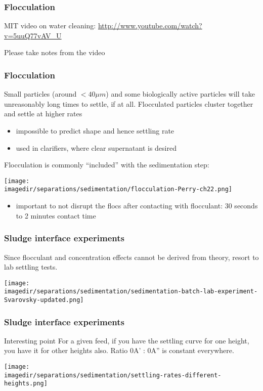 \begin{frame}\frametitle{Flocculation}
	MIT video on water cleaning: \href{http://www.youtube.com/watch?v=5uuQ77vAV\_U}{http://www.youtube.com/watch?v=5uuQ77vAV\_U}
	
	\vspace{7cm}
	{\tiny Please take notes from the video}
\end{frame}

\begin{frame}\frametitle{Flocculation}
	Small particles (around $< 40 \mu m$) and some biologically active particles will take unreasonably long times to settle, if at all.
	\vspace{12pt}	
	Flocculated particles cluster together and settle at higher rates
	\begin{itemize}
		\item	impossible to predict shape and hence settling rate
		\item	used in clarifiers, where clear supernatant is desired
	\end{itemize}
	\vspace{12pt}
	Flocculation is commonly ``included'' with the sedimentation step:
	\begin{center}
		\texttt{[image: \\imagedir/separations/sedimentation/flocculation-Perry-ch22.png]}
	\end{center}
	\begin{itemize}
		\item	important to not disrupt the flocs after contacting with flocculant: 30 seconds to 2 minutes contact time
	\end{itemize}
\end{frame}

\begin{frame}\frametitle{Sludge interface experiments}
	Since flocculant and concentration effects cannot be derived from theory, resort to lab settling tests.
	\begin{center}
		\texttt{[image: \\imagedir/separations/sedimentation/sedimentation-batch-lab-experiment-Svarovsky-updated.png]}
	\end{center}
\end{frame}

\begin{frame}\frametitle{Sludge interface experiments}
	\begin{exampleblock}{Interesting point}
		For a given feed, if you have the settling curve for one height, you have it for other heights also. Ratio 0A' : 0A'' is constant everywhere.
	\end{exampleblock}
	
	\begin{center}
		\texttt{[image: \\imagedir/separations/sedimentation/settling-rates-different-heights.png]}
	\end{center}
\end{frame}

